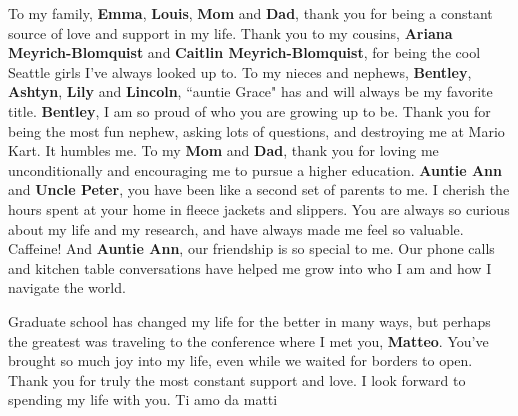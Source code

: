 \documentclass{ucetd}
\begin{document}
To my family, \textbf{Emma}, \textbf{Louis}, \textbf{Mom} and \textbf{Dad}, thank you for being a constant source of love and support in my life.  Thank you to my cousins, \textbf{Ariana Meyrich-Blomquist} and \textbf{Caitlin Meyrich-Blomquist}, for being the cool Seattle girls I've always looked up to.  To my nieces and nephews, \textbf{Bentley}, \textbf{Ashtyn}, \textbf{Lily} and \textbf{Lincoln}, ``auntie Grace" has and will always be my favorite title.  \textbf{Bentley}, I am so proud of who you are growing up to be.  Thank you for being the most fun nephew, asking lots of questions, and destroying me at Mario Kart.  It humbles me.  To my \textbf{Mom} and \textbf{Dad}, thank you for loving me unconditionally and encouraging me to pursue a higher education.  \textbf{Auntie Ann} and \textbf{Uncle Peter}, you have been like a second set of parents to me. 
 I cherish the hours spent at your home in fleece jackets and slippers.  You are always so curious about my life and my research, and have always made me feel so valuable. Caffeine!  And \textbf{Auntie Ann}, our friendship is so special to me.  Our phone calls and kitchen table conversations have helped me grow into who I am and how I navigate the world.

Graduate school has changed my life for the better in many ways, but perhaps the greatest was traveling to the conference where I met you, \textbf{Matteo}.  You've brought so much joy into my life, even while we waited for borders to open.  Thank you for truly the most constant support and love.  I look forward to spending my life with you.  Ti amo da matti 
\end{document}
